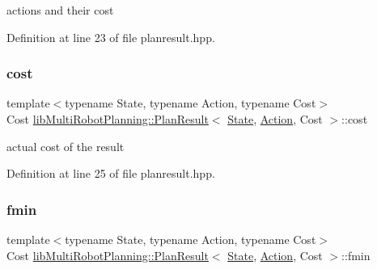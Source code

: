 actions and their cost 



Definition at line 23 of file planresult.\+hpp.

\mbox{\label{structlib_multi_robot_planning_1_1_plan_result_ab340aeae4fdabbd0345403e9fa609d9a}} 
\subsubsection{\texorpdfstring{cost}{cost}}
{\footnotesize\ttfamily template$<$typename State, typename Action, typename Cost$>$ \\
Cost \hyperlink{structlib_multi_robot_planning_1_1_plan_result}{lib\+Multi\+Robot\+Planning\+::\+Plan\+Result}$<$ \hyperlink{structlib_multi_robot_planning_1_1_state}{State}, \hyperlink{namespacelib_multi_robot_planning_aba73fb71693f86a324adfa0e41e1053d}{Action}, Cost $>$\+::cost}



actual cost of the result 



Definition at line 25 of file planresult.\+hpp.

\mbox{\label{structlib_multi_robot_planning_1_1_plan_result_aefdd2f68b906f207ded16bfe46e0f7b0}} 
\subsubsection{\texorpdfstring{fmin}{fmin}}
{\footnotesize\ttfamily template$<$typename State, typename Action, typename Cost$>$ \\
Cost \hyperlink{structlib_multi_robot_planning_1_1_plan_result}{lib\+Multi\+Robot\+Planning\+::\+Plan\+Result}$<$ \hyperlink{structlib_multi_robot_planning_1_1_state}{State}, \hyperlink{namespacelib_multi_robot_planning_aba73fb71693f86a324adfa0e41e1053d}{Action}, Cost $>$\+::fmin}




